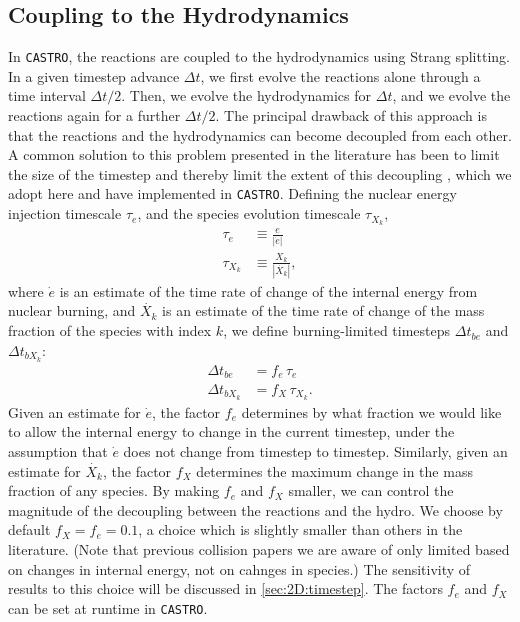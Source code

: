 \documentclass[twocolumn,numberedappendix]{../aastex6}
\newcommand{\castro}{\texttt{CASTRO}}
\begin{document}
\subsection{Coupling to the Hydrodynamics}
\label{sec:hydrocoupling}

In \castro, the reactions are coupled to the hydrodynamics using Strang splitting.
In a given timestep advance $\Delta t$, we first evolve the reactions alone through
a time interval $\Delta t / 2$. Then, we evolve the hydrodynamics for $\Delta t$,
and we evolve the reactions again for a further $\Delta t / 2$. The principal
drawback of this approach is that the reactions and the hydrodynamics can become
decoupled from each other. A common solution to this problem presented in
the literature has been to limit the size of the timestep and thereby limit the
extent of this decoupling \citep{raskin:2010,hawley:2012}, which we adopt here 
and have implemented in \castro. Defining the nuclear energy injection timescale 
$\tau_e$, and the species evolution timescale $\tau_{X_k}$,
\begin{align}
  \tau_e &\equiv \frac{e}{|\dot{e}|} \\
  \tau_{X_k} &\equiv \frac{X_k}{|\dot{X_k}|},
\end{align}
where $\dot{e}$ is an estimate of the time rate of change of the internal energy
from nuclear burning, and $\dot{X_k}$ is an estimate of the time rate of change 
of the mass fraction of the species with index $k$, we define burning-limited 
timesteps $\Delta t_{be}$ and $\Delta t_{bX_k}$:
\begin{align}
  \Delta t_{be} &= f_{e}\, \tau_e \\
  \Delta t_{bX_k} &= f_{X}\, \tau_{X_k}.
\end{align}
Given an estimate for $\dot{e}$, the factor $f_{e}$ determines by what 
fraction we would like to allow the internal energy to change
in the current timestep, under the assumption that $\dot{e}$ does not change from
timestep to timestep. Similarly, given an estimate for $\dot{X_k}$, the factor $f_{X}$ 
determines the maximum change in the mass fraction of any species. By making 
$f_{e}$ and $f_{X}$ smaller, we can control the magnitude of the decoupling 
between the reactions and the hydro. We choose by default $f_{X} = f_{e} = 0.1$, 
a choice which is slightly smaller than others in the literature. (Note that previous 
collision papers we are aware of only limited based on changes in internal energy, 
not on cahnges in species.)  The sensitivity of results to this choice will be discussed in 
\autoref{sec:2D:timestep}. The factors $f_{e}$ and $f_{X}$ can be set at runtime in \castro.
\end{document}
